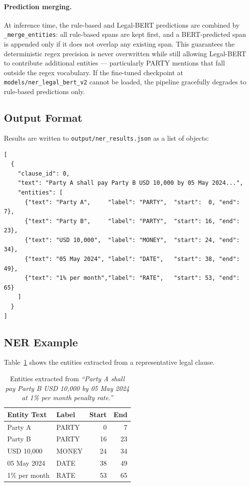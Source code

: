 \documentclass[assignment.tex]{subfiles}
\begin{document}
\paragraph{Prediction merging.}
At inference time, the rule-based and Legal-BERT predictions are combined by
\texttt{\_merge\_entities}: all rule-based spans are kept first, and a
BERT-predicted span is appended only if it does not overlap any existing span.
This guarantees the deterministic regex precision is never overwritten while
still allowing Legal-BERT to contribute additional entities — particularly
PARTY mentions that fall outside the regex vocabulary.  If the fine-tuned
checkpoint at \texttt{models/ner\_legal\_bert\_v2} cannot be loaded, the
pipeline gracefully degrades to rule-based predictions only.

\subsection{Output Format}

Results are written to \texttt{output/ner\_results.json} as a list of objects:

\begin{lstlisting}[style=jsonStyle,
                   caption={NER output format (abbreviated).},
                   label={lst:ner-json}]
[
  {
    "clause_id": 0,
    "text": "Party A shall pay Party B USD 10,000 by 05 May 2024...",
    "entities": [
      {"text": "Party A",     "label": "PARTY",  "start":  0, "end":  7},
      {"text": "Party B",     "label": "PARTY",  "start": 16, "end": 23},
      {"text": "USD 10,000",  "label": "MONEY",  "start": 24, "end": 34},
      {"text": "05 May 2024", "label": "DATE",   "start": 38, "end": 49},
      {"text": "1% per month","label": "RATE",   "start": 53, "end": 65}
    ]
  }
]
\end{lstlisting}

\subsection{NER Example}

Table~\ref{tab:ner-example} shows the entities extracted from a representative
legal clause.

\begin{table}[H]
    \centering
    \caption{Entities extracted from \textit{``Party A shall pay Party B USD 10,000
    by 05 May 2024 at 1\% per month penalty rate.''}}
    \label{tab:ner-example}
    \begin{tabular}{@{}llrr@{}}
        \toprule
        \textbf{Entity Text} & \textbf{Label} & \textbf{Start} & \textbf{End} \\
        \midrule
        Party A      & PARTY  &  0 &  7 \\
        Party B      & PARTY  & 16 & 23 \\
        USD 10,000   & MONEY  & 24 & 34 \\
        05 May 2024  & DATE   & 38 & 49 \\
        1\% per month & RATE  & 53 & 65 \\
        \bottomrule
    \end{tabular}
\end{table}
\end{document}

